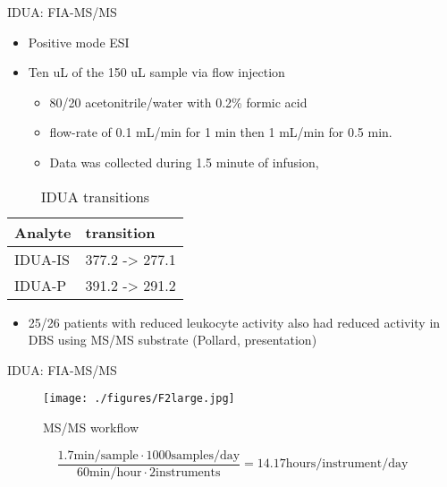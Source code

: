 \documentclass[presentation, smaller]{beamer}
\begin{document}
\begin{frame}[label={sec:orgheadline15}]{IDUA: FIA-MS/MS}
\begin{itemize}
\item Positive mode ESI
\item Ten uL of the 150 uL sample via flow injection
\begin{itemize}
\item 80/20 acetonitrile/water with 0.2\% formic acid
\item flow-rate of 0.1 mL/min for 1 min then 1 mL/min for 0.5 min.
\item Data was collected during 1.5 minute of infusion,
\end{itemize}
\end{itemize}

\begin{table}[htb]
\caption{\label{tab:mrm}
IDUA transitions}
\centering
\begin{tabular}{ll}
Analyte & transition\\
\hline
IDUA-IS & 377.2 -> 277.1\\
IDUA-P & 391.2 -> 291.2\\
\end{tabular}
\end{table}

\begin{itemize}
\item 25/26 patients with reduced leukocyte activity also had reduced
activity in DBS using MS/MS substrate (Pollard, presentation)
\end{itemize}
\end{frame}

\begin{frame}[label={sec:orgheadline16}]{IDUA: FIA-MS/MS}
\begin{figure}[htb]
\centering
\texttt{[image: ./figures/F2large.jpg]}
\caption{\label{fig:msmswf}
MS/MS workflow}
\end{figure}


\[
\frac{1.7 \text{min/sample} \cdot 1000 \text{samples/day}}{60 \text{min/hour} \cdot 2 \text{instruments}}
= 14.17 \text{hours/instrument/day}
\]
\end{frame}
\end{document}
